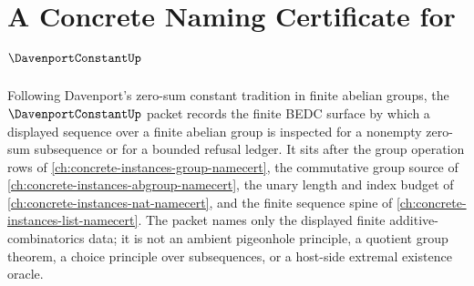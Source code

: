 \chapter{A Concrete Naming Certificate for $\DavenportConstantUp$}
\label{ch:concrete-instances-davenport-constant-namecert}

Following Davenport's zero-sum constant tradition in finite abelian groups, the $\DavenportConstantUp$ packet records the finite BEDC surface by which a displayed sequence over a finite abelian group is inspected for a nonempty zero-sum subsequence or for a bounded refusal ledger. It sits after the group operation rows of \autoref{ch:concrete-instances-group-namecert}, the commutative group source of \autoref{ch:concrete-instances-abgroup-namecert}, the unary length and index budget of \autoref{ch:concrete-instances-nat-namecert}, and the finite sequence spine of \autoref{ch:concrete-instances-list-namecert}. The packet names only the displayed finite additive-combinatorics data; it is not an ambient pigeonhole principle, a quotient group theorem, a choice principle over subsequences, or a host-side extremal existence oracle.

